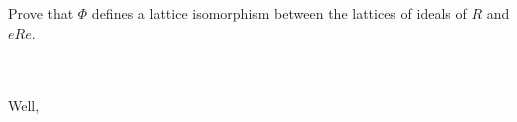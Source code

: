 Prove that $\varPhi$ defines a lattice isomorphism between the lattices of ideals of $R$ and $eRe$.\\\\

\begin{solution}\renewcommand{\qedsymbol}{}\ \\
    Well,
\end{solution}